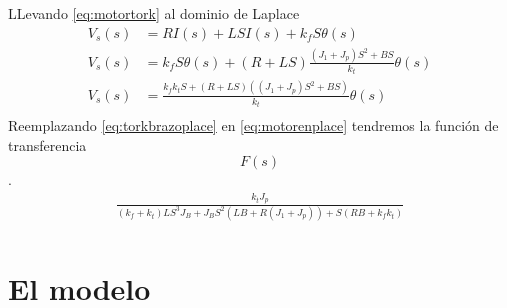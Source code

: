 \documentclass[a4paper]{IEEEtran} %
\begin{document}
LLevando \ref{eq:motortork} al dominio de Laplace 
\begin{equation}
    \begin{split}
        V_{s}(s)&=RI(s)+LSI(s)+k_{f}S\theta(s)\\
        V_{s}(s)&=k_{f}S\theta(s)+(R+LS)\frac{(J_{1}+J_{p})S^2+BS}{k_{t}}\theta(s)\\
        V_{s}(s)&=\frac{k_{f}k_{t}S+(R+LS)((J_{1}+J_{p})S^2+BS)}{k_{t}}\theta(s)\\
    \end{split}
    \label{eq:motorenplace}
\end{equation}
Reemplazando \ref{eq:torkbrazoplace} en \ref{eq:motorenplace} tendremos la función de transferencia$$F(s)$$.
\begin{equation}
    \begin{split}
        \frac{k_{t}J_{p}}{(k_{f}+k_{t})LS^3J_{B}+J_{B}S^2(LB+R(J_{1}+J_{p}))+S(RB+k_{f}k_{t})}\\
    \end{split}
    \label{eq:transfer}
\end{equation}

\section{El modelo}




\end{document}
